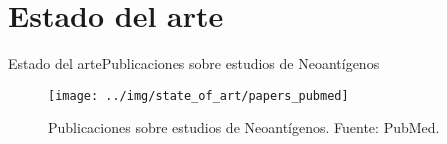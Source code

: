 \documentclass[10pt]{beamer}
\newcommand{\1}{
	\setbeamertemplate{background}{
		\texttt{[image: img/1]}
		\tikz[overlay] \fill[fill opacity=0.75,fill=white] (0,0) rectangle (-\paperwidth,\paperheight);
	}
}
\begin{document}
\section{Estado del arte}

\begin{frame}{Estado del arte}{Publicaciones sobre estudios de Neoantígenos}	
		\begin{figure}
		\centering
		\texttt{[image: ../img/state\_of\_art/papers\_pubmed]}	
		\caption{Publicaciones sobre estudios de Neoantígenos. Fuente: PubMed.}
	\end{figure}
\end{frame}

\end{document}
